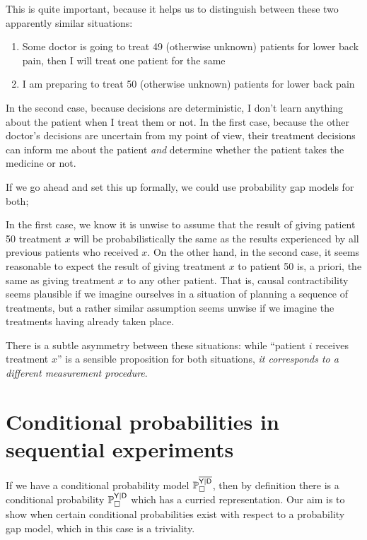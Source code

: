 This is quite important, because it helps us to distinguish between these two apparently similar situations:

\begin{enumerate}
    \item Some doctor is going to treat 49 (otherwise unknown) patients for lower back pain, then I will treat one patient for the same
    \item I am preparing to treat 50 (otherwise unknown) patients for lower back pain
\end{enumerate}

In the second case, because decisions are deterministic, I don't learn anything about the patient when I treat them or not. In the first case, because the other doctor's decisions are uncertain from my point of view, their treatment decisions can inform me about the patient \emph{and} determine whether the patient takes the medicine or not.

If we go ahead and set this up formally, we could use probability gap models for both; 

In the first case, we know it is unwise to assume that the result of giving patient 50 treatment $x$ will be probabilistically the same as the results experienced by all previous patients who received $x$. On the other hand, in the second case, it seems reasonable to expect the result of giving treatment $x$ to patient 50 is, a priori, the same as giving treatment $x$ to any other patient. That is, causal contractibility seems plausible if we imagine ourselves in a situation of planning a sequence of treatments, but a rather similar assumption seems unwise if we imagine the treatments having already taken place.

There is a subtle asymmetry between these situations: while ``patient $i$ receives treatment $x$'' is a sensible proposition for both situations, \emph{it corresponds to a different measurement procedure}.  

\section{Conditional probabilities in sequential experiments}



If we have a conditional probability model $\mathbb{P}_\square^{\overline{\mathsf{Y}|\mathsf{D}}}$, then by definition there is a conditional probability $\mathbb{P}_\square^{\mathsf{Y}|\mathsf{D}}$ which has a curried representation. Our aim is to show when certain conditional probabilities exist with respect to a probability gap model, which in this case is a triviality.

